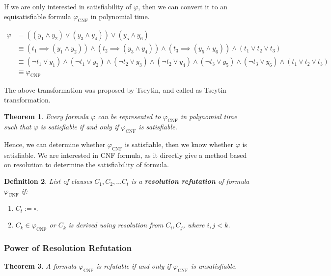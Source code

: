 \documentclass{article}
\newtheorem{theorem}{Theorem}
\newtheorem{definition}[theorem]{Definition}
\begin{document}
If we are only interested in satisfiability of $\varphi$, then we can convert it to an equisatisfiable formula $\varphi_{\text{CNF}}$ in polynomial time.

\begin{align*}
\varphi &= ((y_1 \land y_2) \lor (y_3 \land y_4)) \lor (y_5 \land y_6)\\
&\equiv (t_1 \implies (y_1 \land y_2)) \land (t_2 \implies (y_3 \land y_4)) \land (t_3 \implies (y_5 \land y_6)) \land (t_1 \lor t_2 \lor t_3)\\
&\equiv (\lnot t_1 \lor y_1) \land (\lnot t_1 \lor y_2) \land (\lnot t_2 \lor y_3) \land (\lnot t_2 \lor y_4) \land (\lnot t_3 \lor y_5 ) \land (\lnot t_3 \lor y_6) \land (t_1 \lor t_2 \lor t_3)\\
&\equiv \varphi_{\text{CNF}}
\end{align*}

The above transformation was proposed by Tseytin, and called as Tseytin transformation.
\begin{theorem}
	Every formula $\varphi$ can be represented to $\varphi_{\text{CNF}}$ in polynomial time such that $\varphi$ is satisfiable if and only if $\varphi_{\text{CNF}}$ is satisfiable.
\end{theorem}

Hence, we can determine whether $\varphi_{\text{CNF}}$ is satisfiable, then we know whether $\varphi$ is satisfiable. We are interested in CNF formula, as it directly give a method based on resolution to determine the satisfiability of formula.

\begin{definition}
	List of clauses $C_1, C_2,\ldots C_{t}$ is a \textbf{resolution refutation} of formula $\varphi_{\text{CNF}}$ if:
	\begin{enumerate}
		\item $C_t := \square$.
		\item $C_k \in \varphi_{\text{CNF}}$ or $C_k$ is derived using resolution from $C_i, C_j$, where $i,j < k$.
	\end{enumerate}
\end{definition}

\subsubsection{Power of Resolution Refutation}
\begin{theorem}
	\label{theorem:resolution_proof}
	A formula $\varphi_{\text{CNF}}$ is refutable if and only if $\varphi_{\text{CNF}}$ is unsatisfiable.
\end{theorem}
\end{document}
